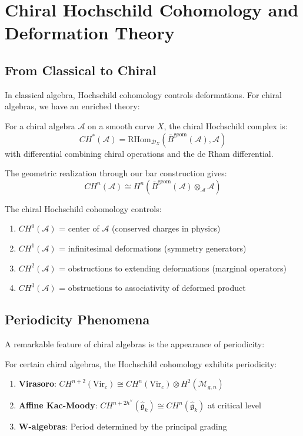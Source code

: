 \section{Chiral Hochschild Cohomology and Deformation Theory}

\subsection{From Classical to Chiral}

In classical algebra, Hochschild cohomology controls deformations. For chiral algebras, we have an enriched theory:

\begin{definition}
For a chiral algebra $\mathcal{A}$ on a smooth curve $X$, the chiral Hochschild complex is:
$$CH^*(\mathcal{A}) = \text{RHom}_{\mathcal{D}_X}(\bar{B}^{\text{geom}}(\mathcal{A}), \mathcal{A})$$
with differential combining chiral operations and the de Rham differential.
\end{definition}

The geometric realization through our bar construction gives:
$$CH^n(\mathcal{A}) \cong H^n\left(\bar{B}^{\text{geom}}(\mathcal{A}) \otimes_{\mathcal{A}} \mathcal{A}\right)$$

\begin{theorem}
The chiral Hochschild cohomology controls:
\begin{enumerate}
\item $CH^0(\mathcal{A})$ = center of $\mathcal{A}$ (conserved charges in physics)
\item $CH^1(\mathcal{A})$ = infinitesimal deformations (symmetry generators)
\item $CH^2(\mathcal{A})$ = obstructions to extending deformations (marginal operators)
\item $CH^3(\mathcal{A})$ = obstructions to associativity of deformed product
\end{enumerate}
\end{theorem}

\subsection{Periodicity Phenomena}

A remarkable feature of chiral algebras is the appearance of periodicity:

\begin{theorem}
For certain chiral algebras, the Hochschild cohomology exhibits periodicity:
\begin{enumerate}
\item \textbf{Virasoro}: $CH^{n+2}(\text{Vir}_c) \cong CH^n(\text{Vir}_c) \otimes H^2(\mathcal{M}_{g,n})$ 
\item \textbf{Affine Kac-Moody}: $CH^{n+2h^\vee}(\widehat{\mathfrak{g}}_k) \cong CH^n(\widehat{\mathfrak{g}}_k)$ at critical level
\item \textbf{W-algebras}: Period determined by the principal grading
\end{enumerate}
\end{theorem}


